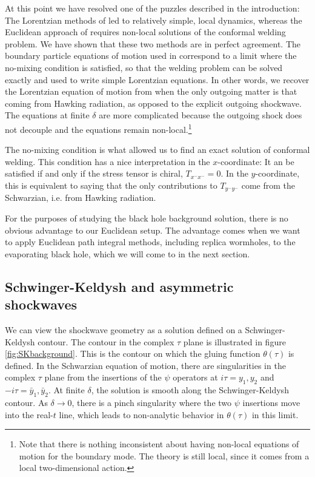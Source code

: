 \documentclass[11pt,oneside,letterpaper]{article}
\numberwithin{equation}{section}
\newcommand{\by}{\bar{y}}
\begin{document}
\begin{spacing}{1.1}
At this point we have resolved one of the puzzles described in the introduction: The Lorentzian methods of \cite{Maldacena:2016upp,Engelsoy:2016xyb,Almheiri:2019psf} led to relatively simple, local dynamics, whereas the Euclidean approach of \cite{Almheiri:2019qdq} requires non-local solutions of the conformal welding problem. We have shown that these two methods are in perfect agreement. The boundary particle equations of  motion used in \cite{Maldacena:2016upp,Engelsoy:2016xyb,Almheiri:2019psf} correspond to a limit where the no-mixing condition is satisfied, so that the welding problem can be solved exactly and used to write simple Lorentzian equations. In other words, we recover the Lorentzian equation of motion from \cite{Maldacena:2016upp,Engelsoy:2016xyb} when the only outgoing matter is that coming from Hawking radiation, as opposed to the explicit outgoing shockwave. The equations at finite $\delta$ are more complicated because the outgoing shock does not decouple and the equations remain non-local.\footnote{Note that there is nothing inconsistent about having non-local equations of motion for the boundary mode. The theory is still local, since it comes from a local two-dimensional action. 
}

The no-mixing condition is what allowed us to find an exact solution of conformal welding. This condition has a nice interpretation in the $x$-coordinate: It an be satisfied if and only if the stress tensor is chiral, $T_{x^- x^-} = 0$. In the $y$-coordinate, this is equivalent to saying that the only contributions to $T_{y^- y^-}$ come from the Schwarzian, i.e. from Hawking radiation.

For the purposes of studying the black hole background solution, there is no obvious advantage to our Euclidean setup. The advantage comes when we want to apply Euclidean path integral methods, including replica wormholes, to the evaporating black hole, which we will come to in the next section.




\subsection{Schwinger-Keldysh and asymmetric shockwaves}

We can view the shockwave geometry as a solution defined on a Schwinger-Keldysh contour\cite{Jana:2020vyx}. The contour in the complex $\tau$ plane is illustrated in figure \ref{fig:SKbackground}. This is the contour on which the gluing function $\theta(\tau)$ is defined. In the Schwarzian equation of motion, there are singularities in the complex $\tau$ plane from the insertions of the $\psi$ operators at $i\tau = y_1, y_2$ and $-i\tau = \by_1,\by_2$. At finite $\delta$, the solution is smooth along the Schwinger-Keldysh contour. As $\delta \to 0$, there is a pinch singularity where the two $\psi$ insertions move into the real-$t$ line, which leads to non-analytic behavior in $\theta(\tau)$ in this limit. 


\end{spacing}
\end{document}
